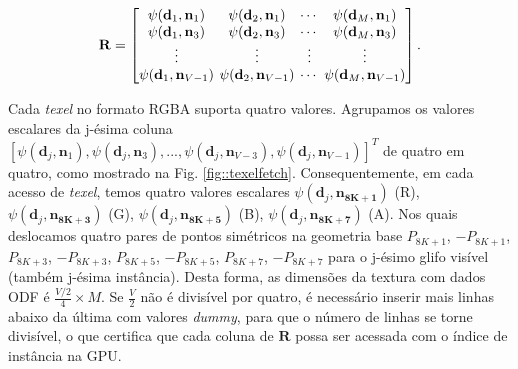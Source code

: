 \documentclass[
    12pt,                %
    oneside,            %
    a4paper,            %
    english,            %
    french,                %
    spanish,            %
    brazil                %
    ]{abntex2}
\begin{document}
\begin{equation}
\label{eq::R}
\mathbf{R} = 
\begingroup %
\setlength\arraycolsep{2pt}
\begin{bmatrix} 
    \psi(\mathbf{d}_{1}, \mathbf{n}_1) &
    \psi(\mathbf{d}_{2}, \mathbf{n}_1) & \cdots & 
    \psi(\mathbf{d}_{M}, \mathbf{n}_1)  \\
    
    \psi(\mathbf{d}_{1}, \mathbf{n}_3) &
    \psi(\mathbf{d}_{2}, \mathbf{n}_3) & \cdots & 
    \psi(\mathbf{d}_{M}, \mathbf{n}_{3}) \\ \vdots & \vdots & \vdots & \vdots  \\
    
    \psi(\mathbf{d}_{1}, \mathbf{n}_{V-1}) & 
    \psi(\mathbf{d}_{2}, \mathbf{n}_{V-1}) & \cdots & 
    \psi(\mathbf{d}_{M}, \mathbf{n}_{V-1})
\end{bmatrix}.
\endgroup
\end{equation}

Cada \textit{texel} no formato RGBA suporta quatro valores. Agrupamos os valores escalares da j-ésima coluna $[
\psi(\mathbf{d}_{j}, \mathbf{n}_1),
\psi(\mathbf{d}_{j}, \mathbf{n}_3), ...,
\psi(\mathbf{d}_{j}, \mathbf{n}_{V-3}),
\psi(\mathbf{d}_{j}, \mathbf{n}_{V-1})
]^T$ de quatro em quatro, como mostrado na Fig. \ref{fig::texelfetch}. Consequentemente, em cada acesso de \textit{texel}, temos quatro valores escalares $
\psi(\mathbf{d}_{j}, \mathbf{\mathbf{n}_{8K+1}})$ (R), $
\psi(\mathbf{d}_{j}, \mathbf{\mathbf{n}_{8K+3}})$ (G), $
\psi(\mathbf{d}_{j}, \mathbf{\mathbf{n}_{8K+5}})$ (B), $
\psi(\mathbf{d}_{j}, \mathbf{\mathbf{n}_{8K+7}})$ (A). Nos quais deslocamos quatro pares de pontos simétricos na geometria base $P_{8K+1}$, $-P_{8K+1}$, $P_{8K+3}$, $-P_{8K+3}$, $P_{8K+5}$, $-P_{8K+5}$, $P_{8K+7}$, $-P_{8K+7}$ para o j-ésimo glifo visível (também j-ésima instância). Desta forma, as dimensões da textura com dados ODF é $ \frac{V/2}{4} \times M$. Se $\frac{V}{2}$ não é divisível por quatro, é necessário inserir mais linhas abaixo da última com valores \textit{dummy}, para que o número de linhas se torne divisível, o que certifica que cada coluna de $\mathbf{R}$ possa ser acessada com o índice de instância na GPU.
\end{document}
